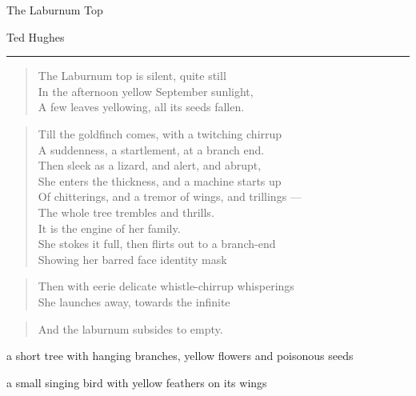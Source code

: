 \documentclass[11pt]{article}
\begin{document}
\begin{flushleft}
    {\selectfont\Huge\color{magenta}The Laburnum Top}
\end{flushleft}

\begin{flushright}
    {\selectfont\LARGE Ted Hughes} \\
    \noindent\rule{1.5in}{0.5pt}
\end{flushright}

\vspace{2em}

\begin{verse}
The Laburnum top is silent, quite still \\
In the afternoon yellow September sunlight, \\
A few leaves yellowing, all its seeds fallen. \\
\end{verse}

\begin{verse}
Till the goldfinch comes, with a twitching chirrup \\
A suddenness, a startlement, at a branch end. \\
Then sleek as a lizard, and alert, and abrupt, \\
She enters the thickness, and a machine starts up \\
Of chitterings, and a tremor of wings, and trillings --- \\
The whole tree trembles and thrills. \\
It is the engine of her family. \\
She stokes it full, then flirts out to a branch-end \\
Showing her barred face identity mask \\
\end{verse}

\begin{verse}
Then with eerie delicate whistle-chirrup whisperings \\
She launches away, towards the infinite \\
\end{verse}

\begin{verse}
And the laburnum subsides to empty.
\end{verse}

\vspace{3em}

\noindent
\colorbox{pink!40}{
\begin{minipage}{\textwidth}
    \vspace{0.5em}
    \begin{description}[leftmargin=6.5em, style=nextline]
        \item[\textbf{laburnum:}] a short tree with hanging branches, yellow flowers and poisonous seeds
        \item[\textbf{goldfinch:}] a small singing bird with yellow feathers on its wings
    \end{description}
    \vspace{0.5em}
\end{minipage}
}
\end{document}
